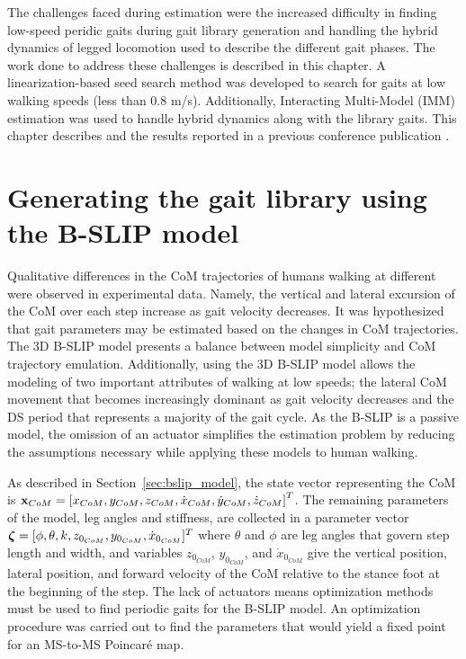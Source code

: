 The challenges faced during estimation were the increased difficulty in finding low-speed peridic gaits during gait library generation and handling the hybrid dynamics of legged locomotion used to describe the different gait phases. The work done to address these challenges is described in this chapter. A linearization-based seed search method was developed to search for gaits at low walking speeds (less than 0.8 m/s). Additionally, Interacting Multi-Model (IMM) estimation was used to handle hybrid dynamics along with the library gaits. This chapter describes and the results reported in a previous conference publication \cite{karulkarapplication}.

\section{Generating the gait library using the B-SLIP model}

Qualitative differences in the CoM trajectories of humans walking at different were observed in experimental data. Namely, the vertical and lateral excursion of the CoM over each step increase as gait velocity decreases. It was hypothesized that gait parameters may be estimated based on the changes in CoM trajectories. The 3D B-SLIP model presents a balance between model simplicity and CoM trajectory emulation. Additionally, using the 3D B-SLIP model allows the modeling of two important attributes of walking at low speeds; the lateral CoM movement that becomes increasingly dominant as gait velocity decreases and the DS period that represents a majority of the gait cycle. As the B-SLIP is a passive model, the omission of an actuator simplifies the estimation problem by reducing the assumptions necessary while applying these models to human walking. 

As described in Section~\ref{sec:bslip_model}, the state vector representing the CoM is $ \mathbf{x}_{CoM} = \left[x_{CoM} ,y_{CoM} ,z_{CoM} ,\dot{x}_{CoM} ,\dot{y}_{CoM} ,\dot{z}_{CoM}\right]^T $. The remaining parameters of the model, leg angles and stiffness, are collected in a parameter vector $ \boldsymbol{\zeta} = [\phi, \theta ,k ,z_{0_{CoM}} ,y_{0_{CoM}} ,\dot{x}_{0_{CoM}}]^T $ where $ \theta $ and $ \phi $ are leg angles that govern step length and width, and variables $ z_{0_{CoM}}$, $y_{0_{CoM}}$, and $\dot{x}_{0_{CoM}} $ give the vertical position, lateral position, and forward velocity of the CoM relative to the stance foot at the beginning of the step. The lack of actuators means optimization methods must be used to find periodic gaits for the B-SLIP model. An optimization procedure was carried out to find the parameters that would yield a fixed point for an MS-to-MS Poincar\'e map.

